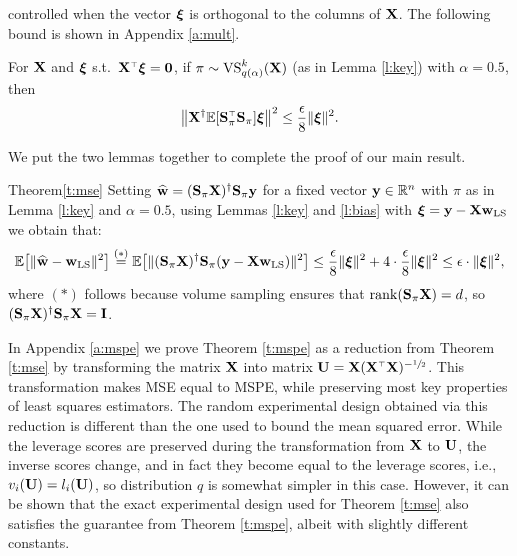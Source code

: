 \documentclass[12pt]{sty/colt2019/colt2018-arxiv}
\begin{document}
controlled when the vector $\boldsymbol\xi$ is orthogonal to the columns of
$\mathbf X$. The following bound is shown in Appendix \ref{a:mult}.
\begin{lemma}\label{l:bias}
  For $\mathbf X$ and $\boldsymbol\xi$ s.t.~$\X^\top\xib=\zero$, if
  $\pi\sim{\mathrm{VS}}_{q(\alpha)}^k(\mathbf X)$ (as in Lemma \ref{l:key}) with
  $\alpha=0.5$, then 
  \begin{align*}
    \big\|\X^\dagger\E[\S_\pi^\top\S_\pi]\xib\big\|^2\leq
    \frac\epsilon 8\|\xib\|^2.
  \end{align*}
\end{lemma}
We put the two lemmas together to complete the proof of our main result.
\begin{proofof}{Theorem}{\ref{t:mse}}
Setting $\widehat{\mathbf w}=(\mathbf{S}_\pi\mathbf X)^\dagger\mathbf{S}_\pi\mathbf y$ for a fixed vector
$\mathbf y\in\mathbb R^n$ with $\pi$ as in Lemma
\ref{l:key} and $\alpha=0.5$, using Lemmas \ref{l:key} and
\ref{l:bias} with $\boldsymbol\xi=\mathbf y-\mathbf X\mathbf w_{\mathrm{LS}}$ we obtain that:
\begin{align*}
  \mathbb E\big[\|\widehat{\mathbf w}-\mathbf w_{\mathrm{LS}}\|^2 \big] \overset{(*)}{=}
  \mathbb E\big[\|(\mathbf{S}_\pi\mathbf X)^\dagger\mathbf{S}_\pi (\mathbf y- \mathbf X\mathbf w_{\mathrm{LS}})\|^2\big]
  \leq \frac\epsilon 8\|\boldsymbol\xi\|^2 + 4\cdot\frac\epsilon 8\|\boldsymbol\xi\|^2\leq
  \epsilon\cdot\|\boldsymbol\xi\|^2,
\end{align*}
where $(*)$ follows because volume sampling ensures that
$\mathrm{rank}(\mathbf{S}_\pi\mathbf X)=d$, so $(\mathbf{S}_\pi\mathbf X)^\dagger\mathbf{S}_\pi\mathbf X=\mathbf I$.
\end{proofof}

In Appendix \ref{a:mspe} we prove Theorem \ref{t:mspe} as a reduction from Theorem
\ref{t:mse} by transforming the matrix $\mathbf X$ into matrix
$\U=\X(\X^\top\X)^{-\sfrac12}$. This transformation makes MSE equal to
MSPE, while preserving most key properties of least squares estimators.
The random experimental design obtained via this reduction is different
than the one used to bound the mean squared error. While the leverage
scores are preserved during the
transformation from $\mathbf X$ to $\mathbf U$, the inverse scores change, and in
fact they become equal to the leverage scores, i.e.,
$v_i(\mathbf U)=l_i(\mathbf U)$, so distribution $q$ is somewhat simpler in this
case. However, it can be shown that the exact experimental design
used for Theorem \ref{t:mse} also satisfies the guarantee from Theorem
\ref{t:mspe}, albeit with slightly different constants.
\end{document}
